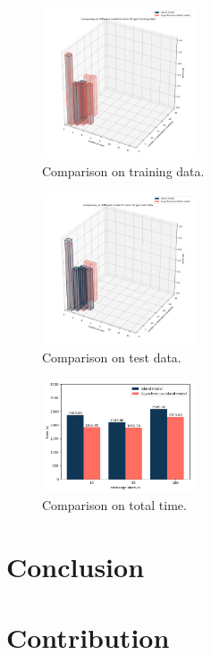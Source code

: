 \documentclass[conference]{IEEEtran}
\begin{document}
\begin{figure}[H]
  \centering
  \includegraphics[width=0.4\textwidth]{figures/diffModelTrain.png}
  \caption{Comparison on training data.}\label{diffModelTr}
\end{figure}
\begin{figure}[H]
  \centering
  \includegraphics[width=0.4\textwidth]{figures/diffModelTest.png}
  \caption{Comparison on test data.}\label{diffModelTest}
\end{figure}
\begin{figure}[H]
  \centering
  \includegraphics[width=0.4\textwidth]{figures/diffModelTime.png}
  \caption{Comparison on total time.}\label{diffModelTime}
\end{figure}


 \section{Conclusion}
 
  \section{Contribution}
  
   



\end{document}
